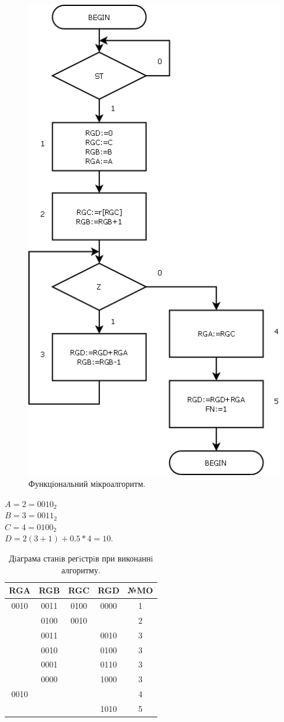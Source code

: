 \documentclass[a4paper, 10pt]{article}
\begin{document}
\begin{figure}[H]
\begin{center}
\includegraphics[scale=0.25]{f_alg.png}
\caption{Функціональний мікроалгоритм.}
\end{center}
\end{figure}

\noindent
$A=2=0010_{2}$\\
$B=3=0011_{2}$\\
$C=4=0100_{2}$\\
$D=2(3+1)+0.5*4=10.$
\begin{table}[h!]
\centering
\begin{tabular}{|c|c|c|c|c|}
\hline
 RGA& RGB& RGC& RGD& №MO\\
\hline
0010&0011&0100&0000&1\\
    &0100&0010&    &2\\
    &0011&    &0010&3\\
    &0010&    &0100&3\\
    &0001&    &0110&3\\
    &0000&    &1000&3\\
0010&    &    &    &4\\
    &    &    &1010&5\\
\hline
\end{tabular}
\caption{Дiаграма станiв регiстрiв при виконаннi алгоритму.}
\end{table}
\end{document}
